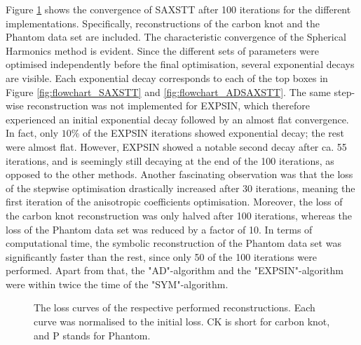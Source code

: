 Figure \ref{fig:Loss_curve_optimal} shows the convergence of SAXSTT after \num{100} iterations for the different implementations.
Specifically, reconstructions of the carbon knot and the Phantom data set are included.
The characteristic convergence of the Spherical Harmonics method is evident.
Since the different sets of parameters were optimised independently before the final optimisation, several exponential decays are visible.
Each exponential decay corresponds to each of the top boxes in Figure \ref{fig:flowchart_SAXSTT} and \ref{fig:flowchart_ADSAXSTT}.
The same step-wise reconstruction was not implemented for EXPSIN, which therefore experienced an initial exponential decay followed by an almost flat convergence.
In fact, only $\num{10}\%$ of the EXPSIN iterations showed exponential decay; the rest were almost flat.
However, EXPSIN showed a notable second decay after ca. \num{55} iterations, and is seemingly still decaying at the end of the \num{100} iterations, as opposed to the other methods.
Another fascinating observation was that the loss of the stepwise optimisation drastically increased after \num{30} iterations, meaning the first iteration of the anisotropic coefficients optimisation.
Moreover, the loss of the carbon knot reconstruction was only halved after \num{100} iterations, whereas the loss of the Phantom data set was reduced by a factor of \num{10}.
In terms of computational time, the symbolic reconstruction of the Phantom data set was significantly faster than the rest, since only \num{50} of the \num{100} iterations were performed.
Apart from that, the "AD"-algorithm and the "EXPSIN"-algorithm were within twice the time of the "SYM"-algorithm.



\begin{figure}[h!]
    \centering
    \caption[Loss Curves of Reconstructions]{ The loss curves of the respective performed reconstructions. Each curve was normalised to the initial loss.
        CK is short for carbon knot, and P stands for Phantom. }
    \label{fig:Loss_curve_optimal}
\end{figure}